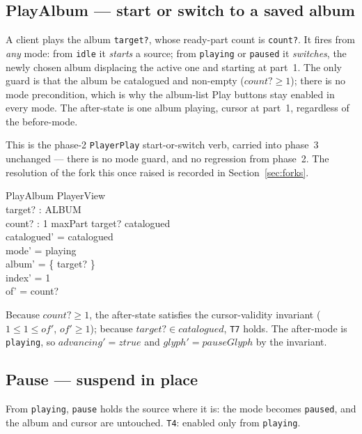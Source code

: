 \documentclass[a4paper,10pt,fleqn]{article}
\begin{document}
\subsection{PlayAlbum --- start or switch to a saved album}
\label{sec:play}

A client plays the album \texttt{target?}, whose ready-part count is
\texttt{count?}. It fires from \emph{any} mode: from \texttt{idle} it
\emph{starts} a source; from \texttt{playing} or \texttt{paused} it
\emph{switches}, the newly chosen album displacing the active one and starting
at part~1. The only guard is that the album be catalogued and non-empty
($count? \geq 1$); there is no mode precondition, which is why the album-list
Play buttons stay enabled in every mode. The after-state is one album playing,
cursor at part~1, regardless of the before-mode.

This is the phase-2 \texttt{PlayerPlay} start-or-switch verb, carried into
phase~3 unchanged --- there is no mode guard, and no regression from phase~2.
The resolution of the fork this once raised is recorded in
Section~\ref{sec:forks}.

\begin{schema}{PlayAlbum}
  \Delta PlayerView \\
  target? : ALBUM \\
  count? : 1 \upto maxPart
  \where
  target? \in catalogued \\
  catalogued' = catalogued \\
  mode' = playing \\
  album' = \{ target? \} \\
  index' = 1 \\
  of' = count?
\end{schema}

Because $count? \geq 1$, the after-state satisfies the cursor-validity invariant
($1 \leq 1 \leq of'$, $of' \geq 1$); because $target? \in catalogued$,
\texttt{T7} holds. The after-mode is \texttt{playing}, so $advancing' = ztrue$
and $glyph' = pauseGlyph$ by the invariant.

\subsection{Pause --- suspend in place}
\label{sec:pause}

From \texttt{playing}, \texttt{pause} holds the source where it is: the mode
becomes \texttt{paused}, and the album and cursor are untouched. \texttt{T4}:
enabled only from \texttt{playing}.
\end{document}

